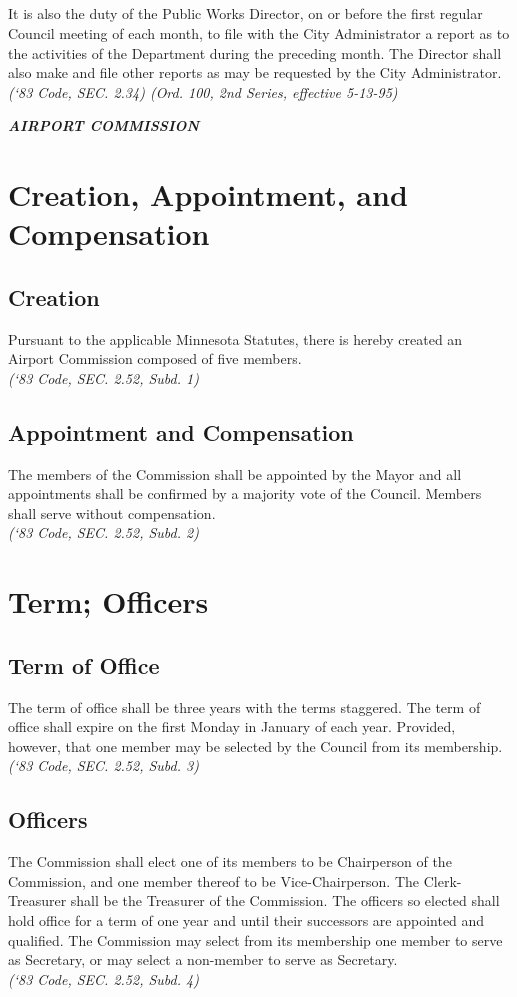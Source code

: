 \subsection{}
It is also the duty of the Public Works Director, on or before the first regular Council meeting of each month, to file with the City Administrator a report as to the activities of the Department during the preceding month.  The Director shall also make and file other reports as may be requested by the City Administrator.\\
\emph{(‘83 Code, SEC. 2.34)  (Ord. 100, 2nd Series, effective 5-13-95)}\\

\centerline{\textbf{\emph{\LARGE{AIRPORT COMMISSION}}}}
\setcounter{section}{99}
\section{Creation, Appointment, and Compensation}
\subsection{Creation}
Pursuant to the applicable Minnesota Statutes, there is hereby created an Airport Commission composed of five members.\\
\emph{(‘83 Code, SEC. 2.52, Subd. 1)}
\subsection{Appointment and Compensation}
The members of the Commission shall be appointed by the Mayor and all appointments shall be confirmed by a majority vote of the Council.  Members shall serve without compensation.\\
\emph{(‘83 Code, SEC. 2.52, Subd. 2)}
\section{Term; Officers}
\subsection{Term of Office}
The term of office shall be three years with the terms staggered.  The term of office shall expire on the first Monday in January of each year.  Provided, however, that one member may be selected by the Council from its membership.\\
\emph{(‘83 Code, SEC. 2.52, Subd. 3)}
\subsection{Officers}
The Commission shall elect one of its members to be Chairperson of the Commission, and one member thereof to be Vice-Chairperson.  The Clerk-Treasurer shall be the Treasurer of the Commission.  The officers so elected shall hold office for a term of one year and until their successors are appointed and qualified.  The Commission may select from its membership one member to serve as Secretary, or may select a non-member to serve as Secretary.\\
\emph{(‘83 Code, SEC. 2.52, Subd. 4)}
